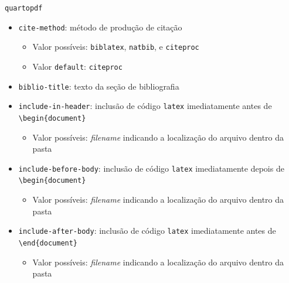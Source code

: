 \documentclass[
  10pt,
  ignorenonframetext,
]{beamer}
\providecommand{\tightlist}{%
  \setlength{\itemsep}{0pt}\setlength{\parskip}{0pt}}\usepackage{longtable,booktabs,array}
\begin{document}
\begin{frame}[fragile]{\texttt{quarto}\newline \texttt{pdf}}
\protect\hypertarget{quartopdf-1}{}
\begin{itemize}
\tightlist
\item
  \texttt{cite-method}: método de produção de citação

  \begin{itemize}
  \tightlist
  \item
    Valor possíveis: \texttt{biblatex}, \texttt{natbib}, e
    \texttt{citeproc}
  \item
    Valor \texttt{default}: \texttt{citeproc}
  \end{itemize}
\item
  \texttt{biblio-title}: texto da seção de bibliografia
\item
  \texttt{include-in-header}: inclusão de código \texttt{latex}
  imediatamente antes de \texttt{\textbackslash{}begin\{document\}}

  \begin{itemize}
  \tightlist
  \item
    Valor possíveis: \emph{filename} indicando a localização do arquivo
    dentro da pasta
  \end{itemize}
\item
  \texttt{include-before-body}: inclusão de código \texttt{latex}
  imediatamente depois de \texttt{\textbackslash{}begin\{document\}}

  \begin{itemize}
  \tightlist
  \item
    Valor possíveis: \emph{filename} indicando a localização do arquivo
    dentro da pasta
  \end{itemize}
\item
  \texttt{include-after-body}: inclusão de código \texttt{latex}
  imediatamente antes de \texttt{\textbackslash{}end\{document\}}

  \begin{itemize}
  \tightlist
  \item
    Valor possíveis: \emph{filename} indicando a localização do arquivo
    dentro da pasta
  \end{itemize}
\end{itemize}
\end{frame}
\end{document}
